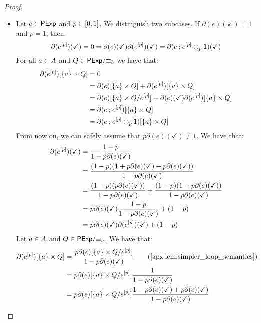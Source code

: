 \begin{proof}
\begin{itemize}
        \item[]  Let $e \in \mathsf{PExp}$ and $p \in \interval{0}{1}$. We distinguish two subcases. If $\partial(e)(\checkmark)=1$ and $p=1$, then:
        $$
        \partial(e^{[p]})(\checkmark) = 0 = \partial(e)(\checkmark)\partial(e^{[p]})(\checkmark) = \partial(e \mathbin{;} e^{[p]} \oplus_p \mathsf{1})(\checkmark)
        $$
        For all $a \in {A}$ and $Q \in {\mathsf{PExp}}/{\equiv_b}$ we have that:
        \begin{align*}
            \partial(e^{[p]})[\{a\} \times Q] &= 0 \\
            &= \partial(e)[\{a\} \times Q] + \partial(e^{[p]})[\{a\} \times Q] \\
            &= \partial(e)[\{a\} \times Q/{e^{[p]}}] + \partial(e)(\checkmark)\partial(e^{[p]})[\{a\} \times Q]\\
            &= \partial(e \mathbin{;} e^{[p]})[\{a\} \times Q]\\
            &= \partial(e \mathbin{;} e^{[p]} \oplus_p \mathsf{1})[\{a\} \times Q]
        \end{align*}
        From now on, we can safely assume that $p\partial(e)(\checkmark)\neq 1$. We have that:
        \begin{align*}
            \partial(e^{[p]})(\checkmark) &= \frac{1-p}{1-p\partial(e)(\checkmark)}\\
            &=\frac{(1-p)(\mathsf{1} + p\partial(e)(\checkmark) - p\partial(e)(\checkmark))}{1-p\partial(e)(\checkmark)}\\
            &=\frac{(1-p)( p\partial(e)(\checkmark))}{1-p\partial(e)(\checkmark)} + \frac{(1-p)(1-p\partial(e)(\checkmark))}{1-p\partial(e)(\checkmark)}\\
            &= p\partial(e)(\checkmark)\frac{1-p}{1-p\partial(e)(\checkmark)} + (1-p)\\
            &= p\partial(e)(\checkmark)\partial(e^{[p]})(\checkmark) + (1-p)\\	        \end{align*}
        Let $a \in {A}$ and $Q \in {\mathsf{PExp}}/{\equiv_b}$. We have that:
        \begin{align*}
            \partial(e^{[p]})[\{a\} \times Q] &= \frac{p\partial(e)[\{a\} \times {Q}/{e^{[p]}}]}{1-p\partial(e)(\checkmark)} \tag{\Cref{apx:lem:simpler_loop_semantics}} \\
            &= p\partial(e)[\{a\} \times {Q}/{e^{[p]}}]\frac{1}{1-p\partial(e)(\checkmark)}\\
            &= p\partial(e)[\{a\} \times {Q}/{e^{[p]}}]\frac{1-p\partial(e)(\checkmark) + p\partial(e)(\checkmark)}{1-p\partial(e)(\checkmark)}\\

\end{align*}
\end{itemize}
\end{proof}
